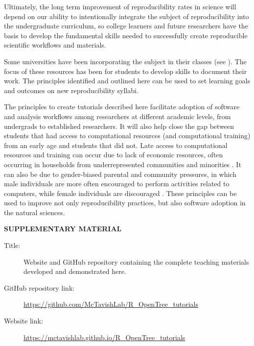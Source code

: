\documentclass[12pt]{article}
\begin{document}
Ultimately, the long term improvement of reproducibility rates in science will depend
on our ability to intentionally integrate the subject of reproducibility into the
undergraduate curriculum, so college learners and future researchers have the
basis to develop the fundamental skills needed to successfully create reproducible
scientific workflows and materials.

Some universities have been incorporating the subject in their classes (see
\cite{uwlibraries2022, nigms2022}).
The focus of these resources has been for students to develop skills to document their work.
The principles identified and outlined here can be used to set learning goals and
outcomes on new reproducibility syllabi.

The principles to create tutorials described here facilitate adoption of software
 and analysis workflows among researchers at different academic levels, from undergrads
  to established researchers.
It will also help close the gap between students that had access to computational
resources (and computational training) from an early age and students that did not.
Late access to computational resources and training can occur due to lack of
economic resources, often occurring in households from underrepresented communities
and minorities \citep{google2016diversity, warner2021quantifying}.
It can also be due to gender-biased parental and community pressures,
in which male individuals are more often encouraged to perform activities related to computers,
while female individuals are discouraged \citep{warner2021quantifying}.
These principles can be used to improve not only reproducibility practices,
 but also software adoption in the natural sciences.


\bigskip
\begin{center}
{\large\bf SUPPLEMENTARY MATERIAL}
\end{center}

\begin{description}

\item[Title:] Website and GitHub repository containing the complete teaching materials developed and demonstrated here.

\item[GitHub repository link:] \url{https://github.com/McTavishLab/R_OpenTree_tutorials}

\item[Website link:] \url{https://mctavishlab.github.io/R_OpenTree_tutorials}

\end{description}


\end{document}
